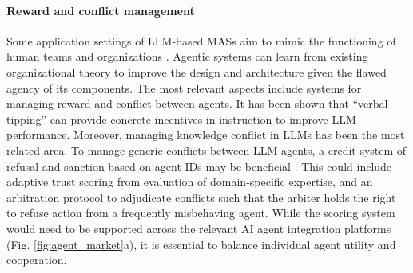 \documentclass[11pt]{article}
\begin{document}


\paragraph{Reward and conflict management} Some application settings of LLM-based MASs aim to mimic the functioning of human teams and organizations \citep{xie_can_2024}. Agentic systems can learn from existing organizational theory \citep{mitnick_theory_1992,vardi_misbehavior_2016} to improve the design and architecture given the flawed agency of its components. The most relevant aspects include systems for managing reward and conflict between agents. It has been shown that ``verbal tipping'' \citep{salinas_butterfly_2024} can provide concrete incentives in instruction to improve LLM performance. Moreover, managing knowledge conflict in LLMs \citep{xu_knowledge_2024} has been the most related area. To manage generic conflicts between LLM agents, a credit system \citep{thomas_credit_2017} of refusal and sanction based on agent IDs may be beneficial \citep{chan_infrastructure_2025}. This could include adaptive trust scoring from evaluation of domain-specific expertise, and an arbitration protocol to adjudicate conflicts such that the arbiter holds the right to refuse action from a frequently misbehaving agent. While the scoring system would need to be supported across the relevant AI agent integration platforms (Fig. \ref{fig:agent_market}a), it is essential to balance individual agent utility and cooperation.


\end{document}
